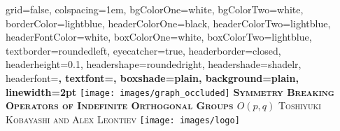\documentclass[portrait,final,paperwidth=90cm,paperheight=120cm,fontscale=0.3]{baposter}
\theoremstyle{definition}
\begin{document}
\begin{poster}%
  {
  grid=false,
  colspacing=1em,
  bgColorOne=white,
  bgColorTwo=white,
  borderColor=lightblue,
  headerColorOne=black,
  headerColorTwo=lightblue,
  headerFontColor=white,
  boxColorOne=white,
  boxColorTwo=lightblue,
  textborder=roundedleft,
  eyecatcher=true,
  headerborder=closed,
  headerheight=0.1\textheight,
  headershape=roundedright,
  headershade=shadelr,
  headerfont=\Large\bf\textsc, %
  textfont={\setlength{\parindent}{1.5em}},
  boxshade=plain,
  background=plain,
  linewidth=2pt
  }
  {\texttt{[image: images/graph\_occluded]}} 
  {\bf\textsc{Symmetry Breaking Operators of Indefinite Orthogonal Groups $O(p,q)$}\vspace{0.5em}}
  {\textsc{ Toshiyuki Kobayashi and Alex Leontiev}}
  {%
    \texttt{[image: images/logo]}
  }

    \newcommand{\colouredcircle}{%
      \tikz{\useasboundingbox (-0.2em,-0.32em) rectangle(0.2em,0.32em); \draw[draw=black,fill=lightblue,line width=0.03em] (0,0) circle(0.18em);}}


\end{poster}
\end{document}
